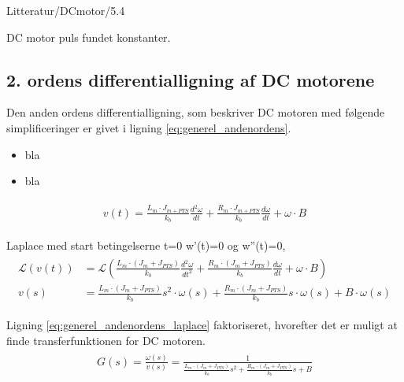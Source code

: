 Litteratur/DCmotor/5.4



DC motor puls fundet konstanter.
\subsection{2. ordens differentialligning af DC motorene}
Den anden ordens differentialligning, som beskriver DC motoren med følgende simplificeringer er givet i ligning \ref{eq:generel_andenordens}.
\begin{itemize}
\item bla 
\item bla 
\end{itemize}

\begin{align}
\begin{split}
v\left( t \right) =\frac { { L }_{ m }\cdot { J }_{ m+PTS } }{ { k }_{ b } } \frac { { d }^{ 2 }\omega  }{ dt } +\frac { { R }_{ m }\cdot { J }_{ m+PTS } }{ { k }_{ b } } \frac { d\omega  }{ dt } +\omega \cdot B\label{eq:generel_andenordens}
\end{split}
\end{align}

Laplace med start betingelserne t=0 w'(t)=0 og w''(t)=0,
\begin{align}
\begin{split}
\mathcal{L}\left( v\left( t \right)  \right) &=\mathcal{L}\left( \frac { { L }_{ m }\cdot \left( { J }_{ m }+{ J }_{ PTS } \right)  }{ { k }_{ b } } \frac { { d }^{ 2 }\omega  }{ { dt }^{ 2 } } +\frac { { R }_{ m }\cdot \left( { J }_{ m }+{ J }_{ PTS } \right)  }{ { k }_{ b } } \frac { d\omega  }{ dt } +\omega \cdot B \right) 
\\
v\left( s \right) &=\frac { { L }_{ m }\cdot \left( { J }_{ m }+{ J }_{ PTS } \right)  }{ { k }_{ b } } { s }^{ 2 }\cdot \omega \left( s \right) +\frac { { R }_{ m }\cdot \left( { J }_{ m }+{ J }_{ PTS } \right)  }{ { k }_{ b } } { s }\cdot \omega \left( s \right) +B\cdot \omega \left( s \right) 
\label{eq:generel_andenordens_laplace}
\end{split}
\end{align}



Ligning \ref{eq:generel_andenordens_laplace} faktoriseret, hvorefter det er muligt at finde transferfunktionen for DC motoren. 
\begin{align}
\begin{split}
G\left( s \right) =\frac { \omega \left( s \right)  }{ v\left( s \right)  } =\frac { 1 }{ \frac { { L }_{ m }\cdot \left( { J }_{ m }+{ J }_{ PTS } \right)  }{ { k }_{ b } } { s }^{ 2 }+\frac { { R }_{ m }\cdot \left( { J }_{ m }+{ J }_{ PTS } \right)  }{ { k }_{ b } } s+B } 
\label{eq:generel_tf}
\end{split}
\end{align}

